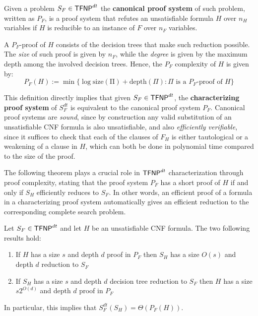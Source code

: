 \begin{definition}
 Given a problem $S_F \in \mathsf{TFNP}^{dt}$ the \textbf{canonical proof system} of such problem, written as $P_F$, is a proof system that refutes an unsatisfiable formula $H$ over $n_H$ variables if $H$ is reducible to an instance of $F$ over $n_F$ variables. 
\end{definition} 

A $P_F$-proof of $H$ consists of the decision trees that make such reduction possible. The \textit{size} of such proof is given by $n_F$, while the \textit{degree} is given by the maximum depth among the involved decision trees. Hence, the $P_F$ complexity of $H$ is given by:
    \[P_F(H) := \min\{\log \mathrm{size(\Pi)}+ \mathrm{depth}(\Pi) : \Pi \text{ is a $P_F$-proof of } H\}\]

This definition directly implies that given $S_F \in \mathsf{TFNP}^{dt}$, the \textbf{characterizing proof system} of $S_F^{dt}$ is equivalent to the canonical proof system $P_F$. Canonical proof systems are \textit{sound}, since by construction any valid substitution of an unsatisfiable CNF formula is also unsatisfiable, and also \textit{efficiently verifiable}, since it suffices to check that each of the clauses of $F_H$ is either tautological or a weakening of a clause in $H$, which can both be done in polynomial time compared to the size of the proof.

The following theorem plays a crucial role in $\mathsf{TFNP}^{dt}$ characterization through proof complexity, stating that the proof system $P_F$ has a short proof of $H$ if and only if $S_H$ efficiently reduces to $S_F$. In other words, an efficient proof of a formula in a characterizing proof system automatically gives an efficient reduction to the corresponding complete search problem.

\newpage

\begin{theorem}
    \label{equiv_proof}
 Let $S_F \in \mathsf{TFNP}^{dt}$ and let $H$ be an unsatisfiable CNF formula. The two following results hold:
    \begin{enumerate}
        \item If $H$ has a size $s$ and depth $d$ proof in $P_F$ then $S_H$ has a size $O(s)$ and depth $d$ reduction to $S_F$
        \item If $S_H$ has a size $s$ and depth $d$ decision tree reduction to $S_F$ then $H$ has a size $s2^{O(d)}$ and depth $d$ proof in $P_F$
    \end{enumerate}
 In particular, this implies that $S_F^{dt}(S_H) = \Theta(P_F(H))$.
\end{theorem}


